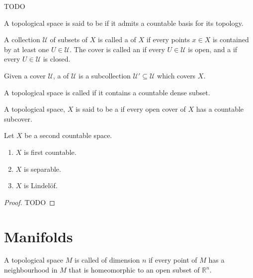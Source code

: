 \begin{example}
	TODO
\end{example}

\begin{definition}
	A topological space is said to be  if it admits a countable basis for its topology.
\end{definition}

\begin{definition}[Covers]
	A collection $ \mathcal{U} $ of subsets of $ X $ is called a  of $ X $ if every points $ x \in X $ is contained by at least one $ U \in \mathcal{U} $. The cover is called an  if every $ U \in \mathcal{U} $ is open, and a  if every $ U \in \mathcal{U} $ is closed.

	Given a cover $ \mathcal{U} $, a  of $ \mathcal{U} $ is a subcollection $ \mathcal{U}' \subseteq \mathcal{U} $ which covers $ X $.
\end{definition}

\begin{definition}[Separable]
	A topological space is called  if it contains a countable dense subset.
\end{definition}

\begin{definition}[Lindel\"of]
	A topological space, $ X $ is said to be a  if every open cover of $ X $ has a countable subcover.
\end{definition}

\begin{theorem}
	Let $ X $ be a second countable space.
	\begin{enumerate}
		\item $ X $ is first countable.
		\item $ X $ is separable.
		\item $ X $ is Lindel\"of.
	\end{enumerate}
	\begin{proof}
		TODO
	\end{proof}
\end{theorem}

\section{Manifolds}
\begin{definition}
	A topological space $ M $ is called  of dimension $ n $ if every point of $ M $ has a neighbourhood in $ M $ that is homeomorphic to an open subset of $ \mathbb{R}^{n} $.
\end{definition}

